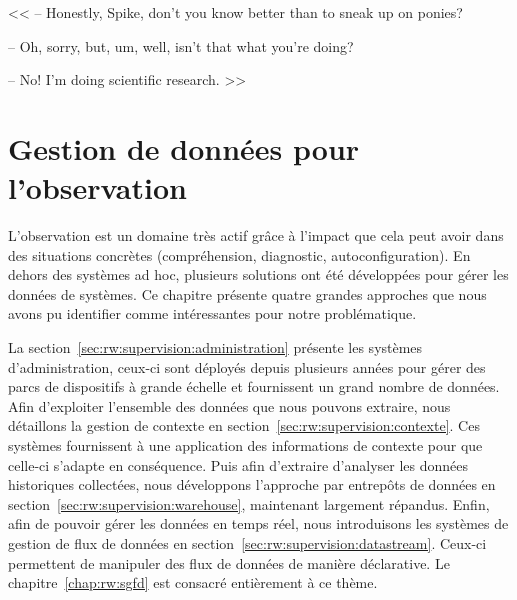 \begin{savequote}[6cm]
<< -- Honestly, Spike, don't you know better than to sneak up on ponies?

-- Oh, sorry, but, um, well, isn't that what you're doing?

-- No! I'm doing scientific research. >>
\end{savequote}

\chapter{Gestion de données pour l'observation}\label{chap:rw:supervision}
\chaptertoc

L'observation est un domaine très actif grâce à l'impact que cela peut avoir dans des situations concrètes (compréhension, diagnostic, autoconfiguration). En dehors des systèmes ad hoc, plusieurs solutions ont été développées pour gérer les données de systèmes. Ce chapitre présente quatre grandes approches que nous avons pu identifier comme intéressantes pour notre problématique.

La section~\ref{sec:rw:supervision:administration} présente les systèmes d'administration, ceux-ci sont déployés depuis plusieurs années pour gérer des parcs de dispositifs à grande échelle et fournissent un grand nombre de données. Afin d'exploiter l'ensemble des données que nous pouvons extraire, nous détaillons la gestion de contexte en section~\ref{sec:rw:supervision:contexte}. Ces systèmes fournissent à une application des informations de contexte pour que celle-ci s'adapte en conséquence.  Puis afin d'extraire d'analyser les données historiques collectées, nous développons l'approche par entrepôts de données en section~\ref{sec:rw:supervision:warehouse}, maintenant largement répandus. Enfin, afin de pouvoir gérer les données en temps réel, nous introduisons les systèmes de gestion de flux de données en section~\ref{sec:rw:supervision:datastream}. Ceux-ci permettent de manipuler des flux de données de manière déclarative. Le chapitre~\ref{chap:rw:sgfd} est consacré entièrement à ce thème.







